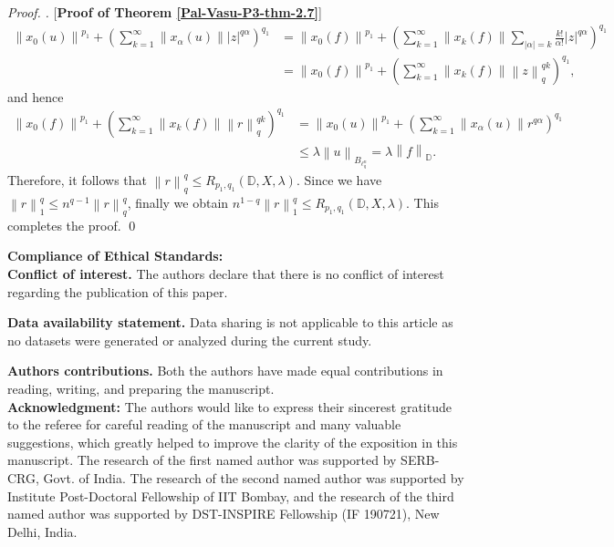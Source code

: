 \documentclass[a4paper,12pt]{amsart}
\theoremstyle{definition}
\newenvironment{pf}[1][]{%
 \vskip 3mm
 \noindent
 \ifthenelse{\equal{#1}{}}%
  {{\slshape Proof. }}%
  {{\slshape #1.} }%
 }%
{\qed\bigskip}
\newcommand{\norm}[1]{\left\lVert#1\right\rVert}
\begin{document}
\begin{pf} [{\bf Proof of Theorem \ref{Pal-Vasu-P3-thm-2.7}}]
	\begin{align*}
		\norm{x_0(u)}^{p_1} + \left(\sum_{k=1}^{\infty}\norm{x_{\alpha}(u)}|z|^{q\alpha}\right)^{q_1}&= 
		\norm{x_0(f)}^{p_1} + \left(\sum_{k=1}^{\infty}\norm{x_k(f)}\sum_{|\alpha|=k}\frac{k!}{\alpha!}|z|^{q\alpha}\right)^{q_1}\\[2mm] & =\norm{x_0(f)}^{p_1} + \left(\sum_{k=1}^{\infty}\norm{x_k(f)}\norm{z}^{qk}_{q}\right)^{q_1},
	\end{align*}
	and hence
	\begin{align*}
		\norm{x_0(f)}^{p_1} + \left(\sum_{k=1}^{\infty}\norm{x_k(f)}\norm{r}^{qk}_{q}\right)^{q_1} & =
		\norm{x_0(u)}^{p_1} + \left(\sum_{k=1}^{\infty}\norm{x_{\alpha}(u)}r^{q\alpha}\right)^{q_1}\\[2mm]&\leq \lambda \norm{u}_{B_{\ell^n_q}}=\lambda \norm{f}_{\mathbb{D}}.
	\end{align*}
	Therefore, it follows that $\norm{r}^q_{q}\leq R_{p_1,q_1}(\mathbb{D},X,\lambda)$. Since we have $\norm{r}^q_{1}\leq n^{q-1}\norm{r}^q_{q}$, finally we obtain $n^{1-q}\norm{r}^q_{1}\leq R_{p_1,q_1}(\mathbb{D},X,\lambda)$. This completes the proof. 
\end{pf}

 \vspace{3mm}
 
 \noindent\textbf{Compliance of Ethical Standards:}\\
 
 \noindent\textbf{Conflict of interest.} The authors declare that there is no conflict  of interest regarding the publication of this paper.
 \vspace{1.5mm}
 
 \noindent\textbf{Data availability statement.}  Data sharing is not applicable to this article as no datasets were generated or analyzed during the current study.
 \vspace{1.5mm}
 
 \noindent\textbf{Authors contributions.} Both the authors have made equal contributions in reading, writing, and preparing the manuscript.\\
 
\noindent\textbf{Acknowledgment:} 
 The authors would like to express their sincerest gratitude to the referee for careful reading of the manuscript and many valuable suggestions, which greatly helped to improve the clarity of the exposition in this manuscript. 
The research of the first named author was supported by SERB-CRG, Govt. of India.  The research of the second named author was supported by Institute Post-Doctoral Fellowship of IIT Bombay, and the research of the third named author was supported by DST-INSPIRE Fellowship (IF 190721),  New Delhi, India.
\end{document}
